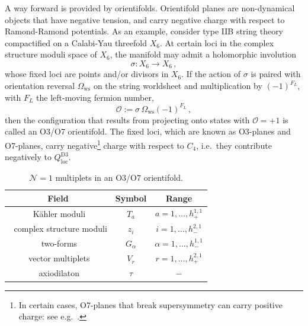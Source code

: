 \documentclass[12pt,a4wide]{article}
\begin{document}
A way forward is provided by orientifolds.  
Orientifold planes are non-dynamical objects that have negative tension, and carry negative charge with respect to Ramond-Ramond potentials.  As an example, consider type IIB string theory compactified on a Calabi-Yau threefold $X_6$.
At certain loci in the complex structure moduli space of $X_6$, the manifold may admit a holomorphic involution 
\begin{equation}
\sigma: X_6 \to X_6\,,   
\end{equation}
whose fixed loci are points and/or divisors in $X_6$.  
If the action of $\sigma$ is paired with orientation reversal $\Omega_{\text{ws}}$ on the string worldsheet and multiplication by $(-1)^{F_L}$, with $F_L$ the left-moving fermion number, 
\begin{equation}
\mathcal{O} := \sigma\, \Omega_{\text{ws}} (-1)^{F_L}\,,
\end{equation}
then the configuration that results from projecting onto states with $\mathcal{O}=+1$ is called an O3/O7 orientifold.
The fixed loci, which are known as O3-planes and O7-planes,
carry negative\footnote{In certain cases, O7-planes that break supersymmetry can carry positive charge: see e.g.~\cite{Carta:2020ohw}.} charge with respect to $C_4$, i.e.~they contribute negatively to $Q_{\text{loc}}^{\text{D3}}$. 


\begin{table}
    \centering
    \setlength\extrarowheight{5pt}
    \begin{tabular}{ccc}
        Field & Symbol & Range \\
        \hline
         $\phantom{\bigl.}$K\"ahler moduli & $T_a$ & $a=1,\ldots,h^{1,1}_+$\\
          $\phantom{\bigl.}$ complex structure moduli & $z_i$  & $i=1,\ldots,h^{2,1}_-$\\
          $\phantom{\bigl.}$two-forms & $G_{\alpha}$ & $\alpha=1,\ldots,h^{1,1}_-$\\
          $\phantom{\bigl.}$vector multiplets & $V_r$ & $r=1,\ldots,h^{2,1}_+$\\
          $\phantom{\bigl.}$axiodilaton & $\tau$ & $-$
          \\[.6ex]
          \hline
    \end{tabular}
    \caption{$\mathcal{N}=1$ multiplets in an O3/O7 orientifold.}
    \label{tab:multiplets}
\end{table}
\end{document}
